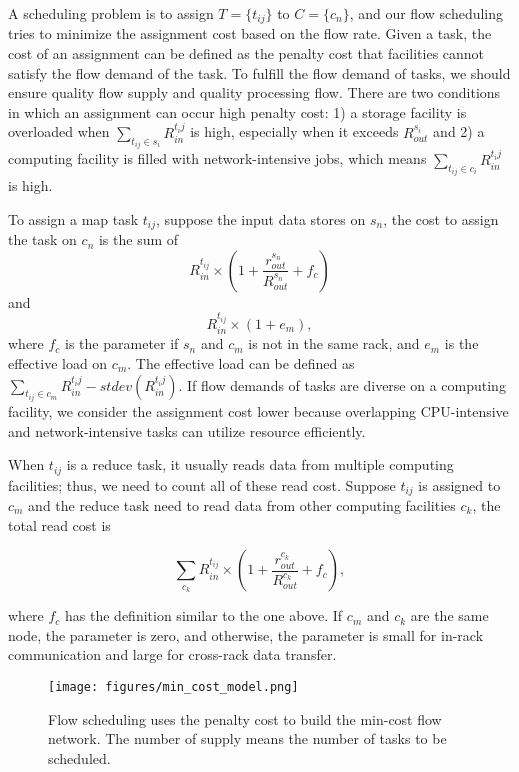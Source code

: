 A scheduling problem is to assign $T=\{t_{ij}\}$ to $C=\{c_{n}\}$, and our flow scheduling tries to minimize the assignment cost based on the flow rate.
Given a task, the cost of an assignment can be defined as the penalty cost that facilities cannot satisfy the flow demand of the task.
To fulfill the flow demand of tasks, we should ensure quality flow supply and quality processing flow.
There are two conditions in which an assignment can occur high penalty cost:
1) a storage facility is overloaded when $\sum_{t_{ij} \in s_i} R^{t_ij}_{in}$ is high, especially when it exceeds $R^{s_{i}}_{out}$
and
2) a computing facility is filled with network-intensive jobs, which means $\sum_{t_{ij} \in c_i} {R^{t_ij}_{in}}$ is high.

To assign a map task $t_{ij}$, suppose the input data stores on $s_n$, the cost to assign the task on $c_n$ is the sum of
\begin{equation*}
R^{t_{ij}}_{in} \times (1+\frac{r^{s_n}_{out}}{R^{s_n}_{out}}+f_{c})
\end{equation*}
and
\begin{equation*}
R^{t_{ij}}_{in} \times (1+e_{m}),
\end{equation*}
where $f_{c}$ is the parameter if $s_n$ and $c_m$ is not in the same rack, and $e_{m}$ is the effective load on $c_m$.
The effective load can be defined as $\sum_{t_{ij} \in c_m} {R^{t_ij}_{in}} - stdev(R^{t_ij}_{in})$.
If flow demands of tasks are diverse on a computing facility, we consider the assignment cost lower because overlapping CPU-intensive and network-intensive tasks can utilize resource efficiently.

When $t_{ij}$ is a reduce task, it usually reads data from multiple computing facilities; thus, we need to count all of these read cost.
Suppose $t_{ij}$ is assigned to $c_{m}$ and the reduce task need to read data from other computing facilities $c_k$, the total read cost is

\begin{equation*}
\sum_{c_{k}} R^{t_{ij}}_{in} \times (1+\frac{r^{c_k}_{out}}{R^{c_k}_{out}}+f_{c}),
\end{equation*}

where $f_c$ has the definition similar to the one above.
If $c_m$ and $c_k$ are the same node, the parameter is zero, and otherwise, the parameter is small for in-rack communication and large for cross-rack data transfer.


\begin{figure}[ht]
    \centering
    \texttt{[image: figures/min\_cost\_model.png]}
    \caption{Flow scheduling uses the penalty cost to build the min-cost flow network. The number of supply means the number of tasks to be scheduled.}
    \label{fig:min_cost_model}
\end{figure}


